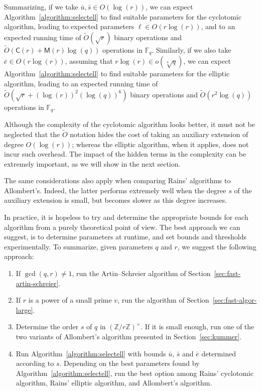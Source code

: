 \documentclass[12pt]{article}
\theoremstyle{plain}
\theoremstyle{definition}
\newcommand{\tildO}{\tilde{O}}
\def\Z{\ensuremath{\mathbb{Z}}}
\def\F{\ensuremath{\mathbb{F}}}
\def\MM{\ensuremath{\mathsf{M}}}
\def\CC{\ensuremath{\mathsf{C}}}
\newcounter{algorithm}
\begin{document}
Summarizing, if we take $\bar{u},\bar{s}\in O(\log(r))$, we can expect
Algorithm~\ref{algorithm:selectell} to find suitable parameters for
the cyclotomic algorithm, leading to expected parameters $\ell\in
O(r\log(r))$, and to an expected running time of $\tildO(\sqrt{r})$
binary operations and $\tildO(\CC(r)+\MM(r)\log(q))$ operations in
$\F_q$.  Similarly, if we also take $\bar{e}\in O(r\log(r))$,
assuming that $r\log(r)\in o(\sqrt[4]{q})$, we can expect
Algorithm~\ref{algorithm:selectell} to find suitable parameters for
the elliptic algorithm, leading to an expected running time of
$\tildO(\sqrt{r}+(\log(r))^2(\log(q))^6)$ binary operations and
$\tildO(r^2\log(q))$ operations in $\F_q$.

Although the complexity of the cyclotomic algorithm looks better, it
must not be neglected that the $\tildO$ notation
hides the cost of taking an auxiliary extension of degree
$O(\log(r))$; whereas the elliptic algorithm, when it applies, does
not incur such overhead. The impact of the hidden terms in the
complexity can be extremely important, as we will show in the next
section. 

The same considerations also apply when comparing Rains' algorithms to
Allombert's. Indeed, the latter performs extremely well when the
degree $s$ of the auxiliary extension is small, but becomes slower as
this degree increases.

In practice, it is hopeless to try and determine the appropriate
bounds for each algorithm from a purely theoretical point of view. The
best approach we can suggest, is to determine parameters at runtime,
and set bounds and thresholds experimentally.
To summarize, given parameters $q$ and $r$, we suggest
the following approach:
\begin{enumerate}
\item If $\gcd(q,r)\ne 1$, run the Artin--Schreier algorithm of
  Section~\ref{sec:fast-artin-schreier}.
\item If $r$ is a power of a small prime $v$, run the algorithm of
  Section~\ref{sec:fast-algor-large}.
\item Determine the order $s$ of $q$ in $(\Z/r\Z)^\times$. If it is
  small enough, run one of the two variants of Allombert's algorithm
  presented in Section~\ref{sec:kummer}.
\item Run Algorithm~\ref{algorithm:selectell} with bounds $\bar{u}$,
  $\bar{s}$ and $\bar{e}$ determined according to $s$. Depending on
  the best parameters found by Algorithm~\ref{algorithm:selectell},
  run the best option among Rains' cyclotomic algorithm, Rains'
  elliptic algorithm, and Allombert's algorithm.
\end{enumerate}
\end{document}
